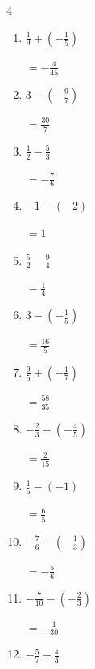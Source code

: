 \begin{multicols}{4}
\begin{enumerate}
  \item $\displaystyle \frac{1}{9} + \left(-\frac{1}{5}\right)$

        $\displaystyle =-\frac{4}{45}$

  \item $\displaystyle 3 - \left(-\frac{9}{7}\right)$

        $\displaystyle =\frac{30}{7}$

  \item $\displaystyle \frac{1}{2} - \frac{5}{3}$

        $\displaystyle =-\frac{7}{6}$

  \item $\displaystyle -1 - \left(-2\right)$

        $\displaystyle =1$

  \item $\displaystyle \frac{5}{2} - \frac{9}{4}$

        $\displaystyle =\frac{1}{4}$

  \item $\displaystyle 3 - \left(-\frac{1}{5}\right)$

        $\displaystyle =\frac{16}{5}$

\columnbreak %

\resetques

  \item $\displaystyle \frac{9}{5} + \left(-\frac{1}{7}\right)$

        $\displaystyle =\frac{58}{35}$

  \item $\displaystyle -\frac{2}{3} - \left(-\frac{4}{5}\right)$

        $\displaystyle =\frac{2}{15}$

  \item $\displaystyle \frac{1}{5} - \left(-1\right)$

        $\displaystyle =\frac{6}{5}$

  \item $\displaystyle -\frac{7}{6} - \left(-\frac{1}{3}\right)$

        $\displaystyle =-\frac{5}{6}$

  \item $\displaystyle -\frac{7}{10} - \left(-\frac{2}{3}\right)$

        $\displaystyle =-\frac{1}{30}$

  \item $\displaystyle -\frac{5}{7} - \frac{4}{3}$


\end{enumerate}
\end{multicols}
